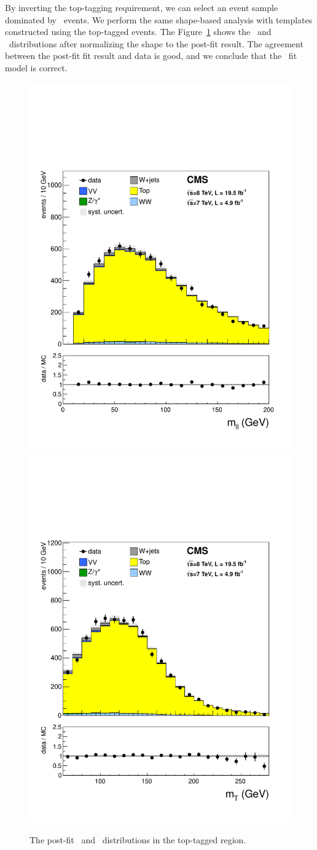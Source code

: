By inverting the top-tagging requirement, we can select an event sample 
dominated by \topbkg\ events. We perform the same shape-based analysis 
with templates constructed using the top-tagged events. 
The Figure~\ref{fig:topCRfit} shows the \mll\ and \mT\ distributions 
after normalizing the shape to the post-fit result. The agreement 
between the post-fit fit result and data is good, and we conclude 
that the \topbkg\ fit model is correct. 

\begin{figure}[!hbtp] 
\begin{center}
    \includegraphics[width=.47\textwidth]{figures/Top_mll_1j.pdf}
    \includegraphics[width=.47\textwidth]{figures/Top_mT_1j.pdf}
    \caption{The post-fit \mll\ and \mT\ distributions in the top-tagged region.} 
    \label{fig:topCRfit}
\end{center}
\end{figure}


